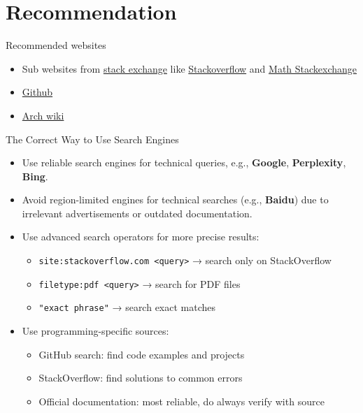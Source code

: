 \section{Recommendation}

\begin{frame}[fragile]{Recommended websites}
	\begin{itemize}
		\item Sub websites from \href{https://stackexchange.com/}{stack exchange} like \href{https://stackoverflow.com/}{Stackoverflow} and \href{https://math.stackexchange.com/}{Math Stackexchange}
		\item \href{https://github.com/}{Github}
		\item \href{https://wiki.archlinux.org/}{Arch wiki}
	\end{itemize}
\end{frame}

\begin{frame}[fragile]{The Correct Way to Use Search Engines}
	\begin{itemize}
		\item Use reliable search engines for technical queries, e.g., \textbf{Google}, \textbf{Perplexity}, \textbf{Bing}.
		\item Avoid region-limited engines for technical searches (e.g., \textbf{Baidu}) due to irrelevant advertisements or outdated documentation.
		\item Use advanced search operators for more precise results:
			\begin{itemize}
				\item \texttt{site:stackoverflow.com <query>} → search only on StackOverflow
				\item \texttt{filetype:pdf <query>} → search for PDF files
				\item \texttt{"exact phrase"} → search exact matches
			\end{itemize}
		\item Use programming-specific sources:
			\begin{itemize}
				\item GitHub search: find code examples and projects
				\item StackOverflow: find solutions to common errors
				\item Official documentation: most reliable, do always verify with source
			\end{itemize}
	\end{itemize}
\end{frame}

